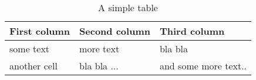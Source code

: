 
%
%

\begin{table}[htb]
	\centering
    \begin{tabular}{| l | l | l |}
		\hline
		First column & Second column & Third column \\
		\hline \hline
		some text		& more text		& bla bla \\
		another cell	& bla bla ...	& and some more text.. \\
		\hline
    \end{tabular}
  \caption{A simple table}
\end{table}
